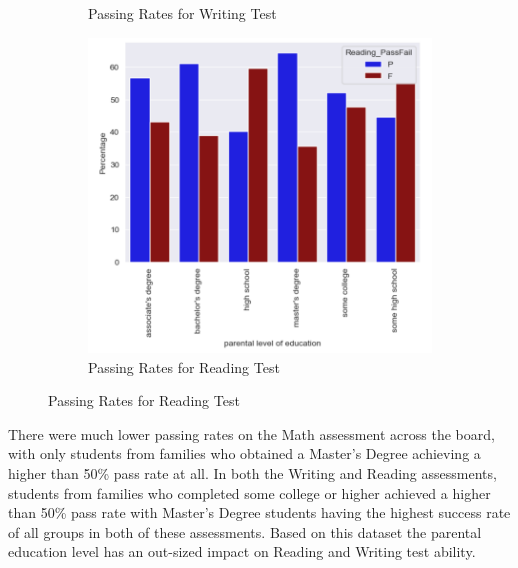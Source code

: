 \documentclass[doc]{apa6} %
\begin{document}
\begin{figure}[H]
\begin{subfigure}[b]{0.28\textwidth}
    \caption{Passing Rates for Writing Test}
    \label{fig:write}
    \end{subfigure}
    \begin{subfigure}[b]{0.28\textwidth}
    \includegraphics[width=\linewidth]{ReadingPFBarGraph.png}
    \caption{Passing Rates for Reading Test}
    \label{fig:read}
    \end{subfigure}
\end{figure}

There were much lower passing rates on the Math assessment across the board, with only students from families who obtained a Master's Degree achieving a higher than 50\% pass rate at all. In both the Writing and Reading assessments, students from families who completed some college or higher achieved a higher than 50\% pass rate with Master's Degree students having the highest success rate of all groups in both of these assessments. Based on this dataset the parental education level has an out-sized impact on Reading and Writing test ability.
\end{document}
